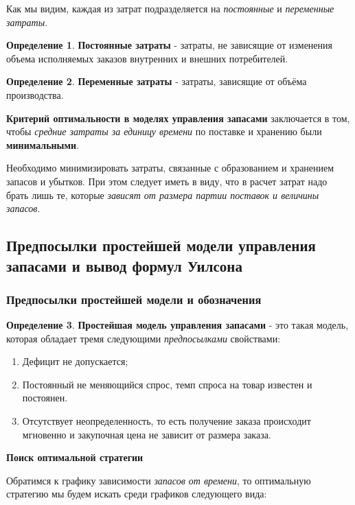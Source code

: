 \documentclass[aps,%
12pt,%
final,%
oneside,
onecolumn,%
musixtex, %
superscriptaddress,%
centertags]{article} %
\theoremstyle{plain}
\theoremstyle{definition}
\newtheorem{definition}{Определение}[subsection]
\theoremstyle{remark}
\begin{document}
Как мы видим, каждая из затрат подразделяется на \textit{постоянные} и \textit{переменные затраты}.

\begin{definition}
	\textbf{Постоянные затраты} - затраты, не зависящие от изменения объема исполняемых заказов внутренних и внешних потребителей.
\end{definition}
\begin{definition}
	\textbf{Переменные затраты} - затраты, зависящие от объёма производства.
\end{definition}

\textbf{Критерий оптимальности в моделях управления запасами} заключается в том, чтобы \textit{средние затраты за единицу времени} по поставке и хранению были \textbf{минимальными}. 

Необходимо минимизировать затраты, связанные с образованием и хранением запасов и убытков. При этом следует иметь в виду, что в расчет затрат надо брать лишь те, которые \textit{зависят от размера партии поставок и величины запасов}.

\newpage
\subsection{Предпосылки простейшей модели управления запасами и вывод формул Уилсона}

\subsubsection{Предпосылки простейшей модели и обозначения}
\begin{definition}
	\textbf{Простейшая модель управления запасами} - это такая модель, которая обладает тремя следующими \textit{предпосылками} свойствами:
	\begin{enumerate}
		\item Дефицит не допускается; 
		\item Постоянный не меняющийся спрос, темп спроса на товар известен и постоянен. 
		\item Отсутствует неопределенность, то есть получение заказа происходит мгновенно и закупочная цена не зависит от размера заказа.
\end{enumerate}
\end{definition}

\textbf{Поиск оптимальной стратегии}

Обратимся к графику зависимости \textit{запасов от времени}, то оптимальную стратегию мы будем искать среди графиков следующего вида:
\begin{center}
\end{center}
\end{document}
